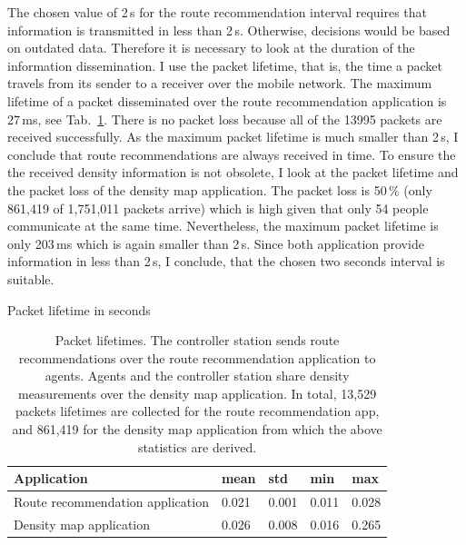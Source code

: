 The chosen value of 2\,s for the route recommendation interval requires that information is transmitted in less than 2\,s. Otherwise, decisions would be based on outdated data. Therefore it is necessary to look at the duration of the information dissemination. I use the packet lifetime, that is, the time a packet travels from its sender to a receiver over the mobile network. The maximum lifetime of a packet disseminated over the route recommendation application is 27\,ms, see Tab.~\ref{tab:packetlifetimerealisticscen}. There is no packet loss because all of the 13995 packets are received successfully. As the maximum packet lifetime is much smaller than 2\,s, I conclude that route recommendations are always received in time. 
To ensure the the received density information is not obsolete, I look at the packet lifetime and the packet loss of the density map application. The packet loss is 50\,\% (only 861,419 of 1,751,011 packets arrive) which is high given that only 54 people communicate at the same time.
Nevertheless, the maximum packet lifetime is only 203\,ms which is again smaller than 2\,s. Since both application provide information in less than 2\,s, I conclude, that the chosen two seconds interval is suitable. 

\begin{table}[hbt!]
\centering
Packet lifetime in seconds \\
\vspace{0.1cm}
\begin{tabular}{|l|l|l|l|l|}
\hline 
Application &  mean & std & min & max \\
\hline 
Route recommendation application & 0.021 & 0.001 & 0.011 & 0.028 \\ \hline
Density map application  & 0.026 & 0.008 & 0.016 & 0.265  \\
\hline 
\end{tabular}
\caption[Packet lifetimes]{Packet lifetimes. The controller station sends route recommendations over the route recommendation application to agents. Agents and the controller station share density measurements over the density map application. In total, 13,529 packets lifetimes are collected for the route recommendation app, and 861,419 for the density map application from which the above statistics are derived. }
\label{tab:packetlifetimerealisticscen}
\end{table}







